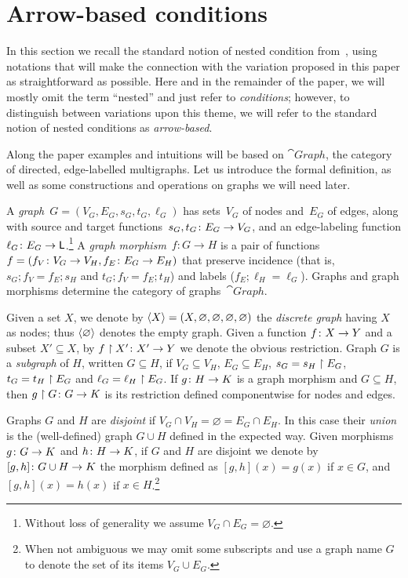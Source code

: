 \section{Arrow-based conditions}

In this section we recall the standard notion of nested condition from~\cite{Rensink-FOL}, using notations that will make the connection with the variation proposed in this paper as straightforward as possible. Here and in the remainder of the paper, we will mostly omit the term ``nested'' and just refer to \emph{conditions}; however, to distinguish between variations upon this theme, we will refer to the standard notion of nested conditions as \emph{arrow-based}.

Along the paper examples and intuitions will be based on $\cat{Graph}$, the category of directed, edge-labelled multigraphs. Let us introduce the formal definition, as well as some constructions and operations on graphs we will need later.

\begin{definition}\label{def:graph-and-morphism}
  A \emph{graph}~$G = (V_G,E_G,s_G,t_G,\ell_G)$ has sets~$V_G$ of nodes and~$E_G$ of edges, along with source and target functions~$s_G,t_G\colon E_G\rightarrow V_G$, and an edge-labeling function $\ell_G\colon E_G \rightarrow \mathsf{L}$.\footnote{Without loss of generality we assume $V_G \cap E_G= \varnothing$.}
  A \emph{graph morphism}~$f:G\to H$ is a pair of functions~$f = (f_V\colon V_G\rightarrow V_H, f_E\colon E_G\rightarrow E_H)$ that preserve incidence (that is, $s_G; f_V = f_E;s_H$ and $t_G; f_V = f_E ; t_H$) and labels ($f_E;\ell_H = \ell_G$).
  Graphs and graph morphisms determine the category of graphs~$\cat{Graph}$.

  Given a set $X$, we denote by $\langle X \rangle = (X,\varnothing,\varnothing,\varnothing,\varnothing)$ the \emph{discrete graph} having $X$ as nodes; thus $\langle \varnothing \rangle$ denotes the empty graph. Given a function $f\colon X \rightarrow Y$ and a subset $X' \subseteq X$, by $f\restriction X'\colon X' \rightarrow Y$ we denote the obvious restriction. Graph $G$ is a \emph{subgraph} of $H$, written $G \subseteq H$, if $V_G \subseteq V_H$, $E_G \subseteq E_H$, $s_G = s_H\restriction E_G$, $t_G = t_H\restriction E_G$ and $\ell_G = \ell_H\restriction E_G$. If $g \colon H \rightarrow K$ is a graph morphism and $G \subseteq H$, then $g \restriction G \colon G \rightarrow K$ is its restriction defined componentwise for nodes and edges.  

  Graphs $G$ and $H$ are \emph{disjoint} if $V_G \cap V_H = \varnothing = E_G \cap E_H$. In this case their \emph{union} is the (well-defined) graph $G \cup H$ defined in the expected way. Given morphisms $g\colon G \rightarrow K$ and $h \colon H \rightarrow K$, if $G$ and $H$ are disjoint we denote by $[g,h]\colon G\cup H \rightarrow K$ the morphism defined as $[g,h](x) = g(x)$ if $x \in G$, and $[g,h](x) = h(x)$ if $x \in H$.\footnote{When not ambiguous we may omit some subscripts and use a graph name $G$ to denote the set of its items $V_G \cup E_G$.}
\end{definition}

